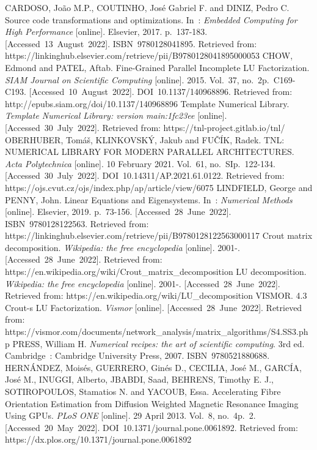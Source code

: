 \clearpage  							   	 %

\begin{thebibliography}{42}
	
	CARDOSO, João M.P., COUTINHO, José Gabriel F. and DINIZ, Pedro C. Source code transformations and optimizations. In : \textit{Embedded Computing for High Performance} [online]. Elsevier, 2017. p. 137-183. [Accessed 13 August 2022]. ISBN 9780128041895. Retrieved from: https://linkinghub.elsevier.com/retrieve/pii/B9780128041895000053
	CHOW, Edmond and PATEL, Aftab. Fine-Grained Parallel Incomplete LU Factorization. \textit{SIAM Journal on Scientific Computing} [online]. 2015. Vol. 37, no. 2p. C169-C193. [Accessed 10 August 2022]. DOI 10.1137/140968896. Retrieved from: http://epubs.siam.org/doi/10.1137/140968896
	Template Numerical Library. \textit{Template Numerical Library: version main:1fc23ee} [online]. [Accessed 30 July 2022]. Retrieved from: https://tnl-project.gitlab.io/tnl/
	OBERHUBER, Tomáš, KLINKOVSKÝ, Jakub and FUČÍK, Radek. TNL: NUMERICAL LIBRARY FOR MODERN PARALLEL ARCHITECTURES. \textit{Acta Polytechnica} [online]. 10 February 2021. Vol. 61, no. SIp. 122-134. [Accessed 30 July 2022]. DOI 10.14311/AP.2021.61.0122. Retrieved from: https://ojs.cvut.cz/ojs/index.php/ap/article/view/6075
	LINDFIELD, George and PENNY, John. Linear Equations and Eigensystems. In : \textit{Numerical Methods} [online]. Elsevier, 2019. p. 73-156. [Accessed 28 June 2022]. ISBN 9780128122563. Retrieved from: https://linkinghub.elsevier.com/retrieve/pii/B9780128122563000117
	Crout matrix decomposition. \textit{Wikipedia: the free encyclopedia} [online]. 2001-. [Accessed 28 June 2022]. Retrieved from: https://en.wikipedia.org/wiki/Crout\_matrix\_decomposition
	LU decomposition. \textit{Wikipedia: the free encyclopedia} [online]. 2001-. [Accessed 28 June 2022]. Retrieved from: https://en.wikipedia.org/wiki/LU\_decomposition
	VISMOR. 4.3 Crout-s LU Factorization. \textit{Vismor} [online]. [Accessed 28 June 2022]. Retrieved from: https://vismor.com/documents/network\_analysis/matrix\_algorithms/S4.SS3.php
	PRESS, William H. \textit{Numerical recipes: the art of scientific computing}. 3rd ed. Cambridge : Cambridge University Press, 2007. ISBN 9780521880688.
	HERNÁNDEZ, Moisés, GUERRERO, Ginés D., CECILIA, José M., GARCÍA, José M., INUGGI, Alberto, JBABDI, Saad, BEHRENS, Timothy E. J., SOTIROPOULOS, Stamatios N. and YACOUB, Essa. Accelerating Fibre Orientation Estimation from Diffusion Weighted Magnetic Resonance Imaging Using GPUs. \textit{PLoS ONE} [online]. 29 April 2013. Vol. 8, no. 4p. 2. [Accessed 20 May 2022]. DOI 10.1371/journal.pone.0061892. Retrieved from: https://dx.plos.org/10.1371/journal.pone.0061892

\end{thebibliography}
